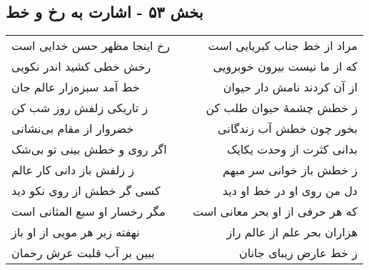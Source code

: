 \begin{center}
\section*{بخش ۵۳ - اشارت به رخ و خط}
\label{sec:sh053}
\begin{longtable}{l p{0.5cm} r}
رخ اینجا مظهر حسن خدایی است
&&
مراد از خط جناب کبریایی است
\\
رخش خطی کشید اندر نکویی
&&
که از ما نیست بیرون خوبرویی
\\
خط آمد سبزه‌زار عالم جان
&&
از آن کردند نامش دار حیوان
\\
ز تاریکی زلفش روز شب کن
&&
ز خطش چشمهٔ حیوان طلب کن
\\
خضروار از مقام بی‌نشانی
&&
بخور چون خطش آب زندگانی
\\
اگر روی و خطش بینی تو بی‌شک
&&
بدانی کثرت از وحدت یکایک
\\
ز زلفش باز دانی کار عالم
&&
ز خطش باز خوانی سر مبهم
\\
کسی گر خطش از روی نکو دید
&&
دل من روی او در خط او دید
\\
مگر رخسار او سبع المثانی است
&&
که هر حرفی از او بحر معانی است
\\
نهفته زیر هر مویی از او باز
&&
هزاران بحر علم از عالم راز
\\
ببین بر آب قلبت عرش رحمان
&&
ز خط عارض زیبای جانان
\\
\end{longtable}
\end{center}

